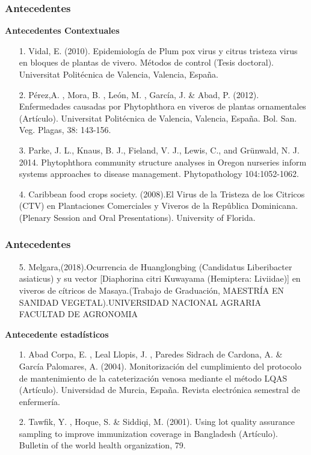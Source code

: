 \documentclass[11pt]{beamer}
\begin{document}
\begin{frame}
\frametitle{Antecedentes}
\textbf{Antecedentes Contextuales}
\begin{itemize}
\justifying
\item[1.]Vidal, E. (2010). Epidemiología de Plum pox virus y citrus tristeza virus en bloques de plantas de vivero. Métodos de control (Tesis doctoral). Universitat Politécnica de Valencia, Valencia, España.
\item[2.]Pérez,A. , Mora, B. , León, M. , García, J. \& Abad, P. (2012). Enfermedades causadas por Phytophthora en viveros de plantas ornamentales (Artículo). Universitat Politécnica de Valencia, Valencia, España. Bol. San. Veg. Plagas, 38: 143-156.
\item[3.]Parke, J. L., Knaus, B. J., Fieland, V. J., Lewis, C., and Grünwald, N. J.
2014. Phytophthora community structure analyses in Oregon nurseries
inform systems approaches to disease management. Phytopathology
104:1052-1062.
\item[4.]Caribbean food crops society. (2008).El Virus de la Tristeza de los Citricos (CTV) en Plantaciones Comerciales y Viveros
de la Repûblica Dominicana.(Plenary Session and Oral Presentations). University of Florida.
\end{itemize}
\end{frame}

\begin{frame}
\frametitle{Antecedentes}
\begin{itemize}
\item[5.]Melgara,(2018).Ocurrencia de Huanglongbing (Candidatus Liberibacter asiaticus) y su vector [Diaphorina citri Kuwayama (Hemiptera: Liviidae)] en viveros de cítricos de Masaya.(Trabajo de Graduación, MAESTRÍA EN SANIDAD VEGETAL).UNIVERSIDAD NACIONAL AGRARIA
FACULTAD DE AGRONOMIA
\end{itemize}
\textbf{Antecedente estadísticos}
\begin{itemize}
\justifying
\item[1.]Abad Corpa, E. , Leal Llopis, J. , Paredes Sidrach de Cardona, A. \& García Palomares, A. (2004). Monitorización del cumplimiento del protocolo de mantenimiento de la cateterización venosa mediante el método LQAS (Artículo). Universidad de Murcia, España. Revista electrónica semestral de enfermería.
\item[2.] Tawfik, Y. , Hoque, S. \&  Siddiqi, M. (2001). Using lot quality assurance sampling to improve immunization coverage in Bangladesh (Artículo). Bulletin of the world health organization, 79.
\end{itemize}
\end{frame}
\end{document}
